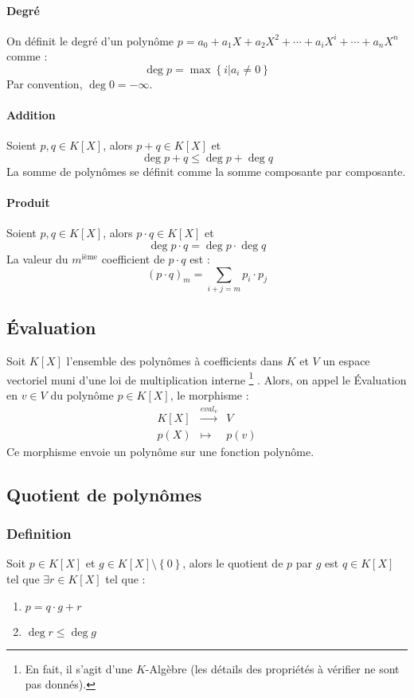 \documentclass[a4paper,10pt]{article}
\newcommand{\ap}{ \rightarrow} %
\newcommand{\set}[1]{\left\lbrace #1 \right\rbrace } %
\begin{document}
   \paragraph{Degré} On définit le degré d'un polynôme $p=a_0 + a_1 X + a_2 X^2 + \cdots + a_i X^i + \cdots + a_n X^n$ comme : 
     $$\deg p = \max \set{i | a_i \neq 0}$$
    Par convention, $\deg 0=-\infty$.
   \paragraph{Addition} Soient $p,q \in K[X]$, alors $p+q \in K[X]$ et
     $$\deg p+q \leq \deg p + \deg q$$
    La somme de polynômes se définit comme la somme composante par composante.
   \paragraph{Produit} Soient $p,q \in K[X]$, alors $p \cdot q \in K[X]$ et
     $$\deg p\cdot q = \deg p \cdot \deg q$$
    La valeur du $m^\text{ième}$ coefficient de $p\cdot q$ est :
     $$(p \cdot q)_m = \sum_{i+j=m} p_i \cdot p_j$$

  \subsection{Évaluation}
   \label{morpheval}
   Soit $K[X]$ l'ensemble des polynômes à coefficients dans $K$ et $V$ un espace vectoriel muni d'une loi de multiplication interne
   \footnote{En fait, il s'agit d'une $K$-Algèbre (les détails des propriétés à vérifier ne sont pas donnés).}%
   . Alors, on appel le Évaluation en $v\in V$ du polynôme $p\in K[X]$, le morphisme :
   \begin{eqnarray*}
    K[X] & \overset{eval_v}{\ap} & V\\
    p(X) & \mapsto & p(v)
   \end{eqnarray*}
   Ce morphisme envoie un polynôme sur une fonction polynôme.

  \subsection{Quotient de polynômes}
   \subsubsection{Definition}
    Soit $p\in K[X]$ et $g \in K[X]\setminus \set{0}$, alors le quotient de $p$ par $g$ est $q\in K[X]$ tel que $\exists r \in K[X]$ tel que :
    \begin{enumerate}
     \item $p=q\cdot g+r$
     \item $\deg r \leq \deg g$
    \end{enumerate}
\end{document}
